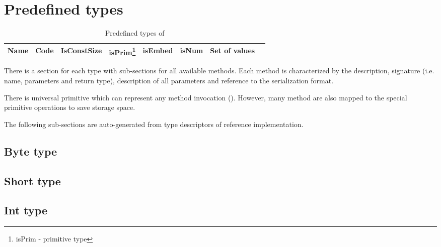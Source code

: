 \section{Predefined types}
\label{sec:appendix:predeftypes}

\begin{table}[h]
    \small
    \begin{tabu}{|l |l |l |l |l |l |l |l|}
     \hline
     \rowfont{\bfseries}
        Name   &   Code   &  IsConstSize & 
        isPrim\footnote{isPrim - primitive type} & 
        isEmbed  & isNum & Set of values \\
        \hline



    \hline
    \end{tabu}
    \caption{Predefined types of \langname}
    \label{table:predeftypes}
\end{table}

There is a section for each type with sub-sections for all available methods. Each
method is characterized by the description, signature (i.e. name, parameters and return
type), description of all parameters and reference to the serialization format.

There is universal primitive which can represent any method invocation
(). However, many method are also mapped to the special primitive
operations to save storage space.

The following sub-sections are auto-generated from type descriptors of \langname reference
implementation.

% 

\subsection{Byte type}
\label{sec:type:Byte}


\subsection{Short type}
\label{sec:type:Short}
 

\subsection{Int type}
\label{sec:type:Int}
 

